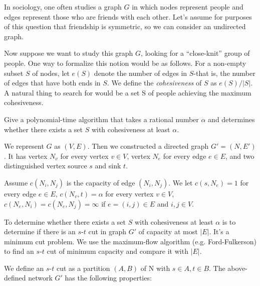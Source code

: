 \newpage
{} %

\problemdes

In sociology, one often studies a graph $G$ in which nodes represent people and edges represent those who are friends with each other. Let’s assume for purposes of this question that friendship is symmetric, so we can consider an undirected graph.

Now suppose we want to study this graph $G$, looking for a “close-knit” group of people. One way to formalize this notion would be as follows. For a non-empty subset $S$ of nodes, let $e(S)$ denote the number of edges in $S$-that is, the number of edges that have both ends in $S$. We define the \textit{cohesiveness} of $S$ as $e(S)/|S|$. A natural thing to search for would be a set S of people achieving the maximum cohesiveness.


Give a polynomial-time algorithm that takes a rational number $\alpha$ and determines whether there exists a set $S$ with cohesiveness at least $\alpha$.

\solution


We represent $G$ as $(V, E)$. Then we constructed a directed graph $G'=(N, E')$. It has vertex $N_v$ for every vertex $v\in V$, vertex $N_e$ for every edge $e\in E$, and two distinguished vertex source $s$ and sink $t$. 

Assume $c(N_i, N_j)$ is the capacity of edge $(N_i, N_j)$. We let $c(s, N_e)=1$ for every edge $e\in E$, $c(N_v, t)=\alpha$ for every vertex $v\in V$, $c(N_e, N_i)=c(N_e, N_j)=\infty$ if $e=(i, j)\in E$ and $i,j\in V$. 

To determine whether there exists a set $S$ with cohesiveness at least $\alpha$ is to determine if there is an $s$-$t$ cut in graph $G'$ of capacity at most $|E|$. It's a minimum cut problem. We use the maximum-flow algorithm (e.g. Ford-Fulkerson) to find an $s$-$t$ cut of minimum capacity and compare it with $|E|$.



We define an $s$-$t$ cut as a partition $(A, B)$ of N with $s \in A, t \in B$. The above-defined network $G'$ has the following properties:

